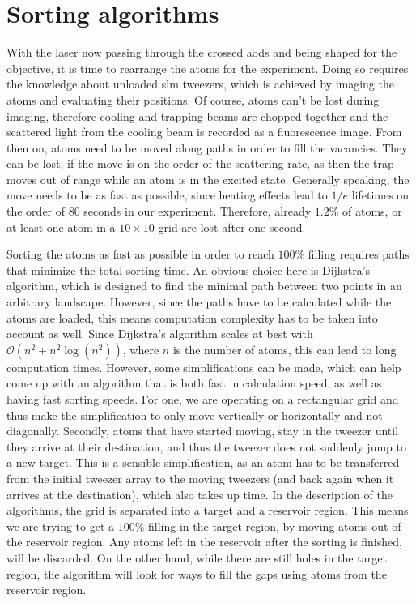 \section{Sorting algorithms}

With the laser now passing through the crossed \acp{aod} and being shaped for the objective, it is time to rearrange the atoms for the experiment. Doing so requires the knowledge about unloaded \ac{slm} tweezers, which is achieved by imaging the atoms and evaluating their positions. Of course, atoms can't be lost during imaging, therefore cooling and trapping beams are chopped together and the scattered light from the cooling beam is recorded as a fluorescence image. From then on, atoms need to be moved along paths in order to fill the vacancies. They can be lost, if the move is on the order of the scattering rate, as then the trap moves out of range while an atom is in the excited state. Generally speaking, the move needs to be as fast as possible, since heating effects lead to $1/e$ lifetimes on the order of 80 seconds in our experiment.  Therefore, already $1.2\%$ of atoms, or at least one atom in a $10\times10$ grid are lost after one second.

Sorting the atoms as fast as possible in order to reach $100\%$ filling requires paths that minimize the total sorting time. An obvious choice here is Dijkstra's algorithm, which is designed to find the minimal path between two points in an arbitrary landscape. However, since the paths have to be calculated while the atoms are loaded, this means computation complexity has to be taken into account as well. Since Dijkstra's algorithm scales at best with $\mathcal{O}(n^2 + n^2 \log{(n^2)})$\cite{Fredman1984}, where $n$ is the number of atoms, this can lead to long computation times. However, some simplifications can be made, which can help come up with an algorithm that is both fast in calculation speed, as well as having fast sorting speeds.
For one, we are operating on a rectangular grid and thus make the simplification to only move vertically or horizontally and not diagonally. Secondly, atoms that have started moving, stay in the tweezer until they arrive at their destination, and thus the tweezer does not suddenly jump to a new target. This is a sensible simplification, as an atom has to be transferred from the initial tweezer array to the moving tweezers (and back again when it arrives at the destination), which also takes up time. In the description of the algorithms, the grid is separated into a target and a reservoir region. This means we are trying to get a $100\%$ filling in the target region, by moving atoms out of the reservoir region. Any atoms left in the reservoir after the sorting is finished, will be discarded. On the other hand, while there are still holes in the target region, the algorithm will look for ways to fill the gaps using atoms from the reservoir region.

